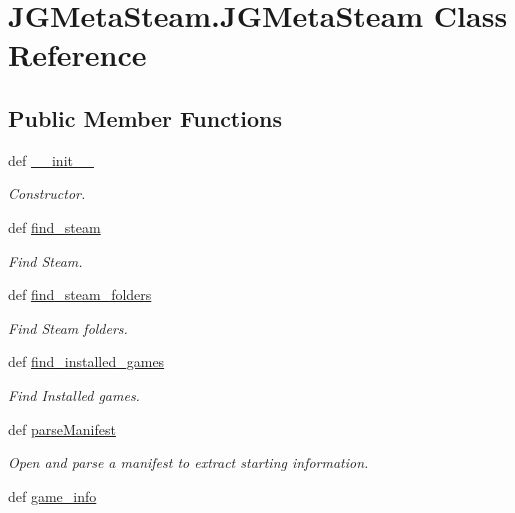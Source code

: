 \hypertarget{class_j_g_meta_steam_1_1_j_g_meta_steam}{\section{J\+G\+Meta\+Steam.\+J\+G\+Meta\+Steam Class Reference}
\label{class_j_g_meta_steam_1_1_j_g_meta_steam}
}
\subsection*{Public Member Functions}
\begin{DoxyCompactItemize}
\item 
def \hyperlink{class_j_g_meta_steam_1_1_j_g_meta_steam_a46a6c53d1b9cd4e4420e737d2f894f2c}{\+\_\+\+\_\+init\+\_\+\+\_\+}
\begin{DoxyCompactList}\small\item\em Constructor. \end{DoxyCompactList}\item 
def \hyperlink{class_j_g_meta_steam_1_1_j_g_meta_steam_ad61c5083ca71695f1d5945707c0857ae}{find\+\_\+steam}
\begin{DoxyCompactList}\small\item\em Find Steam. \end{DoxyCompactList}\item 
def \hyperlink{class_j_g_meta_steam_1_1_j_g_meta_steam_a589b698d11b79971bde98e61c3ab25c3}{find\+\_\+steam\+\_\+folders}
\begin{DoxyCompactList}\small\item\em Find Steam folders. \end{DoxyCompactList}\item 
def \hyperlink{class_j_g_meta_steam_1_1_j_g_meta_steam_a8d61d2e7e511e8001ad0de115266ce5b}{find\+\_\+installed\+\_\+games}
\begin{DoxyCompactList}\small\item\em Find Installed games. \end{DoxyCompactList}\item 
def \hyperlink{class_j_g_meta_steam_1_1_j_g_meta_steam_ae6af3be62be13a876f6cae553961381d}{parse\+Manifest}
\begin{DoxyCompactList}\small\item\em Open and parse a manifest to extract starting information. \end{DoxyCompactList}\item 
def \hyperlink{class_j_g_meta_steam_1_1_j_g_meta_steam_abcb0c088945b4058f711e62e91679664}{game\+\_\+info}

\end{DoxyCompactItemize}
